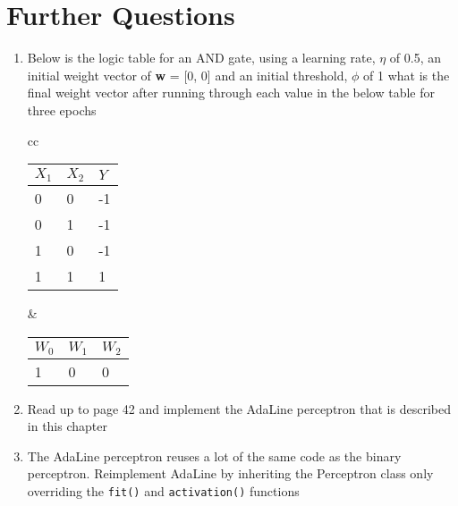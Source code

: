 \documentclass[12pt]{article}
\def\code#1{\texttt{#1}} %
\begin{document}
\section{Further Questions}
\begin{enumerate}
\item Below is the logic table for an AND gate, using a learning rate, $\eta$ of 0.5, an initial weight vector of \textbf{w} = [0, 0] and an initial threshold, $\phi$ of 1 what is the final weight vector after running through each value in the below table for three epochs
\begin{tabular}{cc}
	\begin{minipage}{.5\linewidth}
		\begin{tabular}{ll|l}
		$X_1$ & $X_2$ & $Y$ \\ \hline
		0 & 0 & -1 \\
		0 & 1 & -1 \\
		1 & 0 & -1 \\
		1 & 1 & 1
		\end{tabular}
	\end{minipage} & 
	\begin{minipage}{.5\linewidth}
		\begin{tabular}{lll}
		$W_0$ & $W_1$ & $W_2$ \\ \hline
		1 & 0 & 0 
		\end{tabular}
	\end{minipage} 
\end{tabular}
\item Read up to page 42 and implement the AdaLine perceptron that is described in this chapter 
\item The AdaLine perceptron reuses a lot of the same code as the binary perceptron. Reimplement AdaLine by inheriting the Perceptron class only overriding the \code{fit()} and \code{activation()} functions
\end{enumerate}
\end{document}
